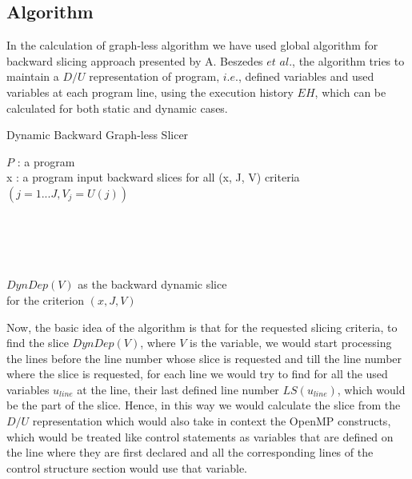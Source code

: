 \documentclass[conference]{IEEEtran}
\begin{document}
\subsection{Algorithm}
\par In the calculation of graph-less algorithm we have used global algorithm for backward slicing approach presented by A. Beszedes $et$ $al.$\cite{b3}, the algorithm tries to maintain a $D/U$ representation of program, $i.e.$, defined variables and used variables at each program line, using the execution history $EH$, which can be calculated for both static and dynamic cases.  
\begin{algorithm}[h]
 \caption{Dynamic Backward Graph-less Slicer}
 \begin{algorithmic}[1]
 \renewcommand{\algorithmicrequire}{\textbf{Input:}}
 \renewcommand{\algorithmicensure}{\textbf{Output:}}
 \REQUIRE $P$ : a program\\
  x : a program input
 \ENSURE  backward slices for all (x, J, V) criteria\\$(j = 1...J,V_j = U(j))$\\
    \\
    \\
    \\
    \\
  \ENDFOR
  
 \RETURN $DynDep(V)$ as the backward dynamic slice\\ for the criterion $(x, J, V) $
 \end{algorithmic}
 \end{algorithm}
 \par Now, the basic idea of the algorithm is that for the requested slicing criteria, to find the slice $DynDep(V)$, where $V$ is the variable, we would start processing the lines before the line number whose slice is requested and till the line number where the slice is requested, for each line we would try to find for all the used variables $u_{line}$ at the line, their last defined line number $LS(u_{line})$, which would be the part of the slice. Hence, in this way we would calculate the slice from the $D/U$ representation which would also take in context the OpenMP constructs, which would be treated like control statements as variables that are defined on the line where they are first declared and all the corresponding lines of the control structure section would use that variable.
\end{document}
